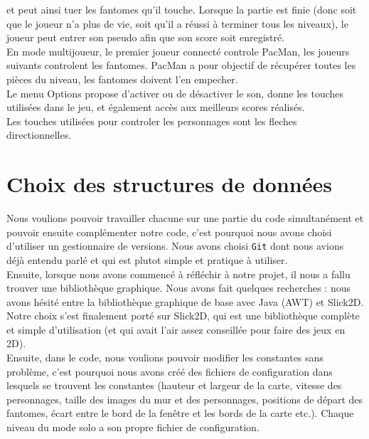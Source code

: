       et peut ainsi tuer les fantomes qu'il touche. 
      Lorsque la partie est finie (donc soit que le joueur n'a plus de vie, soit qu'il a réussi à terminer tous les niveaux), le joueur peut entrer son pseudo afin que son score soit
      enregistré.\\
      En mode multijoueur, le premier joueur connecté controle PacMan, les joueurs suivants controlent les fantomes. PacMan a pour objectif de récupérer toutes les pièces du niveau, les fantomes 
      doivent l'en empecher.\\
      Le menu Options propose d'activer ou de désactiver le son, donne les touches utilisées dans le jeu, et également accès aux meilleurs scores réalisés.\\
      
      Les touches utilisées pour controler les personnages sont les fleches directionnelles.
    
    \section{Choix des structures de données}
      Nous voulions pouvoir travailler chacune sur une partie du code simultanément et pouvoir ensuite complémenter notre code, c'est pourquoi nous avons choisi d'utiliser un gestionnaire 
      de versions. Nous avons choisi \texttt{Git} dont nous avions déjà entendu parlé et qui est plutot simple et pratique à utiliser.\\
      Ensuite, lorsque nous avons commencé à réfléchir à notre projet, il nous a fallu trouver une bibliothèque graphique. Nous avons fait quelques recherches : nous avons hésité entre la bibliothèque
      graphique de base avec Java (AWT) et Slick2D. Notre choix s'est finalement porté sur Slick2D, qui est une bibliothèque complète et simple 
      d'utilisation (et qui avait l'air assez conseillée pour faire des jeux en 2D). \\
      
      Ensuite, dans le code, nous voulions pouvoir modifier les constantes sans problème, c'est pourquoi nous avons créé des fichiers de 
      configuration dans lesquels se trouvent les constantes (hauteur et largeur de la carte, vitesse des personnages, taille des images du mur et
      des personnages, positions de départ des fantomes, écart entre le bord de la fenêtre et les bords de la carte etc.). Chaque niveau du mode solo a son propre
      fichier de configuration.
	